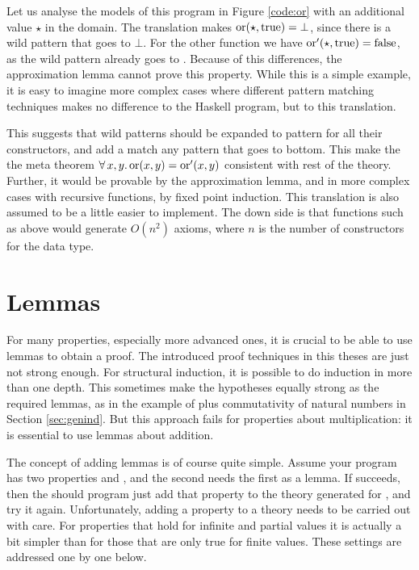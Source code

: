 Let us analyse the models of this program in Figure \ref{code:or} with
an additional value $\star$ in the domain. The translation makes
$\mathrm{or}(\star,\mathrm{true}) = \bot$, since there is a wild pattern that
goes to $\bot$. For the other function we have
$\mathrm{or'}(\star,\mathrm{true}) = \mathrm{false}$, as the wild pattern already
goes to . Because of this differences, the approximation
lemma cannot prove this property. While this is a simple example, it
is easy to imagine more complex cases where different pattern matching
techniques makes no difference to the Haskell program, but to this
translation.

This suggests that wild patterns should be expanded to pattern for all
their constructors, and add a match any pattern that goes to
bottom. This make the the meta theorem
$\forall \, x , y . \, \mathrm{or}(x,y) = \mathrm{or'}(x,y)$ consistent with rest of the
theory.  Further, it would be provable by the approximation lemma, and
in more complex cases with recursive functions, by fixed point
induction. This translation is also assumed to be a little easier to
implement. The down side is that functions such as  above
would generate $O(n^2)$ axioms, where $n$ is the number of constructors for
the data type.

\section{Lemmas}

For many properties, especially more advanced ones, it is crucial to
be able to use lemmas to obtain a proof. The introduced proof
techniques in this theses are just not strong enough. For structural
induction, it is possible to do induction in more than one depth. This
sometimes make the hypotheses equally strong as the required lemmas,
as in the example of plus commutativity of natural numbers in Section
\ref{sec:genind}. But this approach fails for properties about
multiplication: it is essential to use lemmas about addition.

The concept of adding lemmas is of course quite simple. Assume your
program has two properties  and , and the
second needs the first as a lemma. If  succeeds, then the
should program just add that property to the theory generated for
, and try it again. Unfortunately, adding a property to a
theory needs to be carried out with care. For properties that hold for
infinite and partial values it is actually a bit simpler than for
those that are only true for finite values. These settings are
addressed one by one below.

